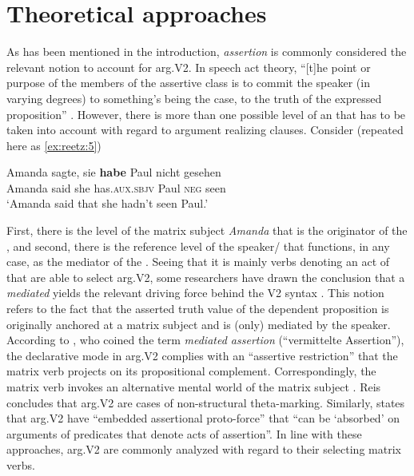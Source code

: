 \documentclass[output=paper,colorlinks,citecolor=brown]{langscibook}
\begin{document}
\section{Theoretical approaches}\label{sec:reetz:2}

As has been mentioned in the introduction, \textit{assertion} is commonly considered the relevant notion to account for arg.V2. In speech act theory, “[t]he point or purpose of the members of the assertive class is to commit the speaker (in varying degrees) to something's being the case, to the truth of the expressed proposition” \citep[12]{Searle1975}. However, there is more than one possible level of an  that has to be taken into account with regard to argument realizing clauses. Consider  (repeated here as \ref{ex:reetz:5})

\ea\label{ex:reetz:5}
\gll Amanda sagte, sie \textbf{habe} Paul nicht gesehen\\
     Amanda said she has.\textsc{aux}.\textsc{sbjv} Paul \textsc{neg} seen\\
\glt `Amanda said that she hadn't seen Paul.'
\z

First, there is the level of the matrix subject \textit{Amanda} that is the originator of the , and second, there is the reference level of the speaker/ that functions, in any case, as the mediator of the . Seeing that it is mainly verbs denoting an act of  that are able to select arg.V2, some researchers have drawn the conclusion that a \textit{mediated}  yields the relevant driving force behind the V2 syntax \citep{Reis1997, Gärtner2002}. This notion refers to the fact that the asserted truth value of the dependent proposition is originally anchored at a matrix subject and is (only) mediated by the speaker. According to \citet[142]{Reis1997}, who coined the term \textit{mediated assertion} (“vermittelte Assertion”), the declarative mode in arg.V2 complies with an “assertive restriction” that the matrix verb projects on its propositional complement. Correspondingly, the matrix verb invokes an alternative mental world of the matrix subject \citep[122]{Reis1997}. Reis concludes that arg.V2 are cases of non-structural theta-marking. Similarly, \citet[40]{Gärtner2002} states that arg.V2 have “embedded assertional proto-force” that “can be ‘absorbed' on arguments of predicates that denote acts of assertion”. In line with these approaches, arg.V2 are commonly analyzed with regard to their selecting matrix verbs.
\end{document}
